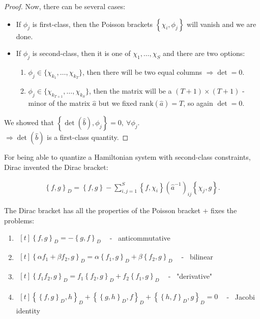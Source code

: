 \begin{proof}
Now, there can be several cases: 
\begin{itemize}
\item If $\phi_j$ is first-class, then the Poisson brackets $\left\{ \chi_i,\phi_j \right\}$ will vanish and we are done.
\item If $\phi_j$ is second-class, then it is one of $\chi_1, \dots, \chi_S$ and there are two options:
\begin{enumerate}
\item $\phi_j \in \{ \chi_{k_1}, \dots, \chi_{k_T} \}$, then there will be two equal columns $\Rightarrow \det =0$.
\item $\phi_j \in \{ \chi_{k_{T+1}}, \dots, \chi_{k_S} \}$, then the matrix will be a $(T+1) \times (T+1)$ - minor of the matrix $\hat{a}$ but we fixed $\text{rank} (\hat{a}) = T$, so again $\det = 0$.
\end{enumerate}
\end{itemize}
We showed that $\left\{ \det (\hat{b}),\phi_j \right\} = 0, \ \forall \phi_j$. \\
$\Longrightarrow  \det (\hat{b})$ is a first-class quantity.
\end{proof}

For being able to quantize a Hamiltonian system with second-class constraints, Dirac invented the Dirac bracket:
\label{sec:dirac_bracket}

\begin{definition}
\begin{align}
\left\{ f,g \right\}_D = \left\{ f,g \right\} - \sum_{i,j = 1}^S \left\{ f,\chi_i \right\} (\hat{a}^{-1})_{ij} \left\{ \chi_j,g \right\}.
\end{align}
\end{definition}

The Dirac bracket has all the properties of the Poisson bracket $+$ fixes the problems:
\begin{enumerate}
\item \(
\begin{aligned}[t]
\left \{ f,g \right \}_D = - \left \{ g,f \right \}_D
\end{aligned} \) \ - \ anticommutative
\item \(
\begin{aligned}[t]
\left \{ \alpha f_1 + \beta f_2,g \right \}_D = \alpha \left \{ f_1,g \right \}_D + \beta \left \{ f_2,g \right \}_D 
\end{aligned} \) \ - \ bilinear
\item \(
\begin{aligned}[t]
\left \{  f_1 f_2,g \right \}_D = f_1 \left \{ f_2,g \right \}_D + f_2 \left \{ f_1,g \right \}_D 
\end{aligned} \) \ - \ "derivative"
\item \(
\begin{aligned}[t]
\left \{ \left \{ f,g \right \}_D,h \right \}_D + \left \{ \left \{ g,h \right \}_D,f \right \}_D + \left \{ \left \{ h,f \right \}_D,g \right \}_D = 0 
\end{aligned} \) \ - \ Jacobi identity
\end{enumerate}

